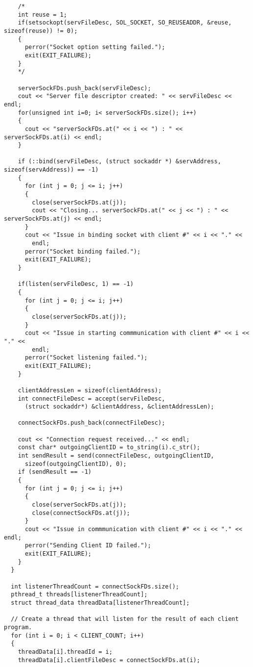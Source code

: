 \documentclass[11pt]{article}
\begin{document}
\begin{verbatim}
    /*
    int reuse = 1;
    if(setsockopt(servFileDesc, SOL_SOCKET, SO_REUSEADDR, &reuse, sizeof(reuse)) != 0);
    {
      perror("Socket option setting failed.");
      exit(EXIT_FAILURE);
    }
    */

    serverSockFDs.push_back(servFileDesc);
    cout << "Server file descriptor created: " << servFileDesc << endl;
    for(unsigned int i=0; i< serverSockFDs.size(); i++)
    {
      cout << "serverSockFDs.at(" << i << ") : " << serverSockFDs.at(i) << endl;
    }

    if (::bind(servFileDesc, (struct sockaddr *) &servAddress, sizeof(servAddress)) == -1)
    {
      for (int j = 0; j <= i; j++)
      {
        close(serverSockFDs.at(j));
        cout << "Closing... serverSockFDs.at(" << j << ") : " << serverSockFDs.at(j) << endl;
      }
      cout << "Issue in binding socket with client #" << i << "." <<
        endl;
      perror("Socket binding failed.");
      exit(EXIT_FAILURE);
    }

    if(listen(servFileDesc, 1) == -1)
    {
      for (int j = 0; j <= i; j++)
      {
        close(serverSockFDs.at(j));
      }
      cout << "Issue in starting commmunication with client #" << i << "." <<
        endl;
      perror("Socket listening failed.");
      exit(EXIT_FAILURE);
    }

    clientAddressLen = sizeof(clientAddress);
    int connectFileDesc = accept(servFileDesc,
      (struct sockaddr*) &clientAddress, &clientAddressLen);

    connectSockFDs.push_back(connectFileDesc);

    cout << "Connection request received..." << endl;
    const char* outgoingClientID = to_string(i).c_str();
    int sendResult = send(connectFileDesc, outgoingClientID,
      sizeof(outgoingClientID), 0);
    if (sendResult == -1)
    {
      for (int j = 0; j <= i; j++)
      {
        close(serverSockFDs.at(j));
        close(connectSockFDs.at(j));
      }
      cout << "Issue in commmunication with client #" << i << "." << endl;
      perror("Sending Client ID failed.");
      exit(EXIT_FAILURE);
    }
  }

  int listenerThreadCount = connectSockFDs.size();
  pthread_t threads[listenerThreadCount];
  struct thread_data threadData[listenerThreadCount];

  // Create a thread that will listen for the result of each client program.
  for (int i = 0; i < CLIENT_COUNT; i++)
  {
    threadData[i].threadId = i;
    threadData[i].clientFileDesc = connectSockFDs.at(i);


\end{verbatim}
\end{document}
